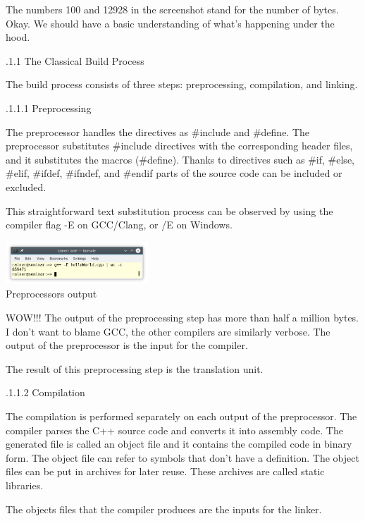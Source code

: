 The numbers 100 and 12928 in the screenshot stand for the number of bytes. Okay. We should have a basic understanding of what’s happening under the hood.

.1.1\hspace{0.2cm} The Classical Build Process

The build process consists of three steps: preprocessing, compilation, and linking.

.1.1.1\hspace{0.2cm} Preprocessing


The preprocessor handles the directives as \#include and \#define. The preprocessor substitutes \#include directives with the corresponding header files, and it substitutes the macros (\#define). Thanks to directives such as \#if, \#else, \#elif, \#ifdef, \#ifndef, and \#endif parts of the source code can be included or excluded.

This straightforward text substitution process can be observed by using the compiler flag -E on GCC/Clang, or /E on Windows.

\begin{center}
\includegraphics[width=0.4\textwidth]{content/3/chapter4/images/13.png}\\
Preprocessors output
\end{center}

WOW!!! The output of the preprocessing step has more than half a million bytes. I don’t want to blame GCC, the other compilers are similarly verbose. The output of the preprocessor is the input for the compiler.

The result of this preprocessing step is the translation unit.

.1.1.2\hspace{0.2cm} Compilation

The compilation is performed separately on each output of the preprocessor. The compiler parses the C++ source code and converts it into assembly code. The generated file is called an object file and it contains the compiled code in binary form. The object file can refer to symbols that don’t have a definition. The object files can be put in archives for later reuse. These archives are called static libraries.

The objects files that the compiler produces are the inputs for the linker.

